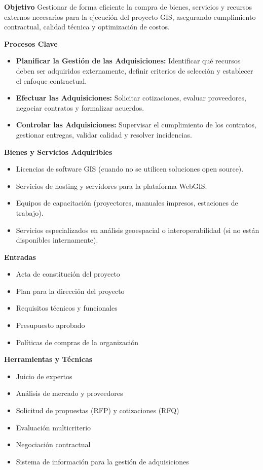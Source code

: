 \begin{multicols}{2}
  \textbf{Objetivo}
Gestionar de forma eficiente la compra de bienes, servicios y recursos externos necesarios para la ejecución del proyecto GIS, asegurando cumplimiento contractual, calidad técnica y optimización de costos.

\textbf{Procesos Clave}
\begin{itemize}
    \item \textbf{Planificar la Gestión de las Adquisiciones:} Identificar qué recursos deben ser adquiridos externamente, definir criterios de selección y establecer el enfoque contractual.
    \item \textbf{Efectuar las Adquisiciones:} Solicitar cotizaciones, evaluar proveedores, negociar contratos y formalizar acuerdos.
    \item \textbf{Controlar las Adquisiciones:} Supervisar el cumplimiento de los contratos, gestionar entregas, validar calidad y resolver incidencias.
\end{itemize}

\textbf{Bienes y Servicios Adquiribles}
\begin{itemize}
    \item Licencias de software GIS (cuando no se utilicen soluciones open source).
    \item Servicios de hosting y servidores para la plataforma WebGIS.
    \item Equipos de capacitación (proyectores, manuales impresos, estaciones de trabajo).
    \item Servicios especializados en análisis geoespacial o interoperabilidad (si no están disponibles internamente).
\end{itemize}

\textbf{Entradas}
\begin{itemize}
    \item Acta de constitución del proyecto
    \item Plan para la dirección del proyecto
    \item Requisitos técnicos y funcionales
    \item Presupuesto aprobado
    \item Políticas de compras de la organización
\end{itemize}

\textbf{Herramientas y Técnicas}
\begin{itemize}
    \item Juicio de expertos
    \item Análisis de mercado y proveedores
    \item Solicitud de propuestas (RFP) y cotizaciones (RFQ)
    \item Evaluación multicriterio
    \item Negociación contractual
    \item Sistema de información para la gestión de adquisiciones
\end{itemize}


\end{multicols}
